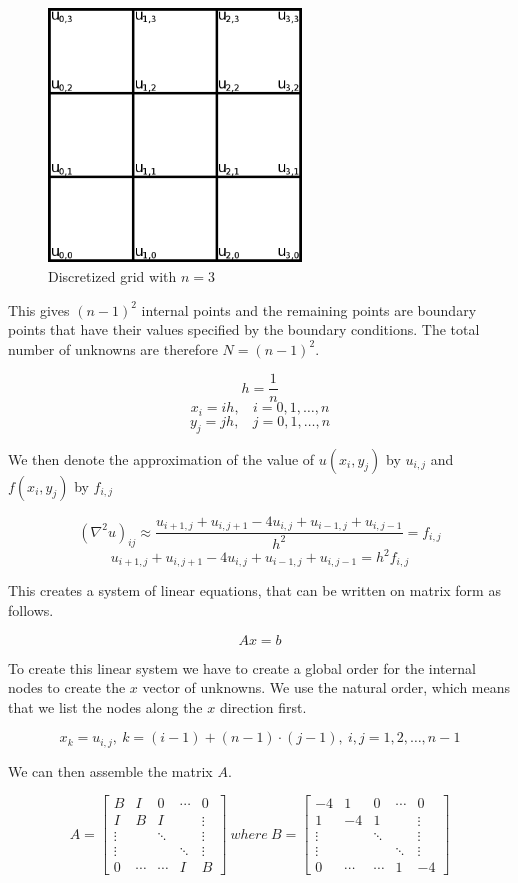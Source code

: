 \begin{figure}[ht]
	\center
	\includegraphics[width=0.6\textwidth]{images/2d_poisson_ex}
	\caption{Discretized grid with $n = 3$}
	\label{fig:discgrid}
\end{figure}

This gives $(n-1)^2$ internal points and the remaining points are boundary
points that have their values specified by the boundary conditions. The total
number of unknowns are therefore $N = (n-1)^2$.

$$h = \frac{1}{n}$$
$$x_i = ih, ~~~~ i = 0, 1, \dots, n$$
$$y_j = jh, ~~~~ j = 0, 1, \dots, n$$

We then denote the approximation of the value of $u(x_i, y_j)$ by $u_{i,j}$ and 
$f(x_i, y_j)$ by $f_{i,j}$

$$ (\nabla^2 u)_{ij} \approx \frac{u_{i+1,j} + u_{i,j+1} - 4u_{i,j} + u_{i-1,j} + u_{i,j-1}}{h^2} = f_{i,j} $$
$$ u_{i+1,j} + u_{i,j+1} - 4u_{i,j} + u_{i-1,j} + u_{i,j-1} = h^2 f_{i,j} $$

This creates a system of linear equations, that can be written on matrix form as
follows.

$$Ax = b$$

To create this linear system we have to create a global order for the
internal nodes to create the $x$ vector of unknowns. We use the natural
order, which means that we list the nodes along the $x$ direction first.

$$x_k = u_{i,j}, ~ k = (i-1) + (n-1) \cdot (j-1), ~ i, j = 1, 2, \dots, n-1$$

We can then assemble the matrix $A$.

$$
A = \begin{bmatrix}
 B & I & 0 & \cdots & 0 \\
 I & B & I &   & \vdots \\
 \vdots &   & \ddots &   & \vdots \\
 \vdots &   &   & \ddots & \vdots \\
 0 & \cdots & \cdots & I & B 
\end{bmatrix}
 ~ where ~ 
B = \begin{bmatrix}
-4 & 1 & 0 & \cdots & 0 \\
 1 &-4 & 1 &   & \vdots \\
 \vdots &   & \ddots &   & \vdots \\
 \vdots &   &   & \ddots & \vdots \\
 0 & \cdots & \cdots & 1 &-4 
\end{bmatrix}
$$

